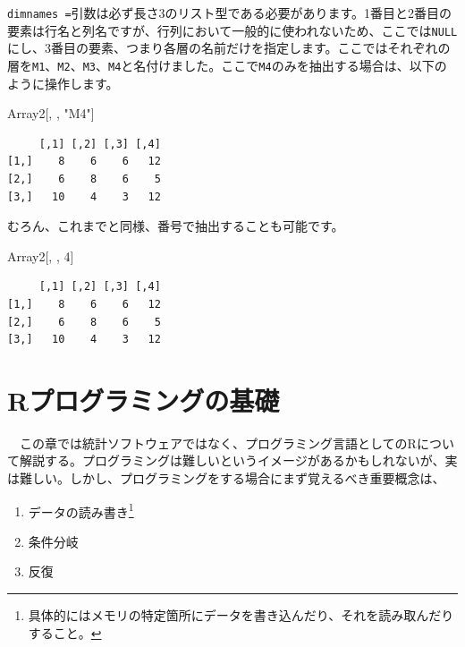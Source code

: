 \documentclass[
  a4paper,
  pandoc,
  ja=standard,
  jafont=haranoaji]{bxjsbook}
\newenvironment{Shaded}{\begin{snugshade}}{\end{snugshade}}
\newcommand{\DecValTok}[1]{\textcolor[rgb]{0.68,0.00,0.00}{#1}}
\newcommand{\NormalTok}[1]{\textcolor[rgb]{0.00,0.48,0.65}{#1}}
\newcommand{\StringTok}[1]{\textcolor[rgb]{0.13,0.47,0.30}{#1}}
\providecommand{\tightlist}{%
  \setlength{\itemsep}{0pt}\setlength{\parskip}{0pt}}
\begin{document}
\texttt{dimnames\ =}引数は必ず長さ3のリスト型である必要があります。1番目と2番目の要素は行名と列名ですが、行列において一般的に使われないため、ここでは\texttt{NULL}にし、3番目の要素、つまり各層の名前だけを指定します。ここではそれぞれの層を\texttt{M1}、\texttt{M2}、\texttt{M3}、\texttt{M4}と名付けました。ここで\texttt{M4}のみを抽出する場合は、以下のように操作します。

\begin{Shaded}
\begin{Highlighting}[numbers=left,,]
\NormalTok{Array2[, , }\StringTok{"M4"}\NormalTok{]}
\end{Highlighting}
\end{Shaded}

\begin{verbatim}
     [,1] [,2] [,3] [,4]
[1,]    8    6    6   12
[2,]    6    8    6    5
[3,]   10    4    3   12
\end{verbatim}

むろん、これまでと同様、番号で抽出することも可能です。

\begin{Shaded}
\begin{Highlighting}[numbers=left,,]
\NormalTok{Array2[, , }\DecValTok{4}\NormalTok{]}
\end{Highlighting}
\end{Shaded}

\begin{verbatim}
     [,1] [,2] [,3] [,4]
[1,]    8    6    6   12
[2,]    6    8    6    5
[3,]   10    4    3   12
\end{verbatim}

\hypertarget{sec-programming}{%
\chapter{Rプログラミングの基礎}\label{sec-programming}}

　この章では統計ソフトウェアではなく、プログラミング言語としてのRについて解説する。プログラミングは難しいというイメージがあるかもしれないが、実は難しい。しかし、プログラミングをする場合にまず覚えるべき重要概念は、

\begin{enumerate}
\def\labelenumi{\arabic{enumi}.}
\tightlist
\item
  データの読み書き\footnote{具体的にはメモリの特定箇所にデータを書き込んだり、それを読み取んだりすること。}
\item
  条件分岐
\item
  反復
\end{enumerate}
\end{document}
